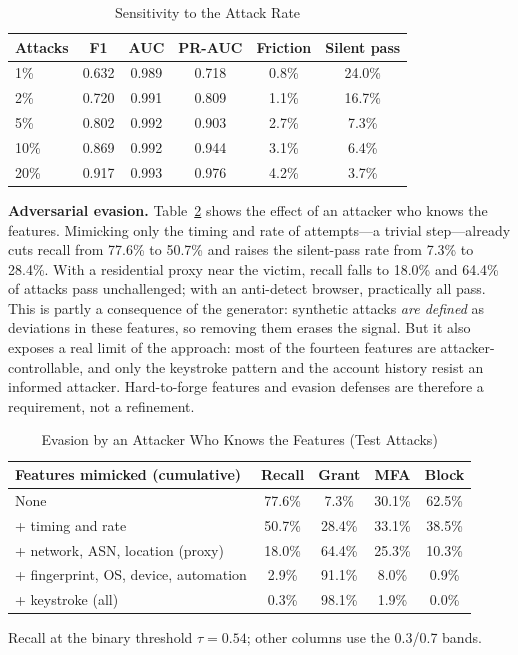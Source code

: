 \documentclass[conference]{IEEEtran}
\begin{document}
\begin{table}[t]
\caption{Sensitivity to the Attack Rate}
\label{tab:prop}
\centering
\footnotesize
\setlength{\tabcolsep}{4pt}
\renewcommand{\arraystretch}{1.15}
\begin{tabular}{@{}lccccc@{}}
\toprule
\textbf{Attacks} & \textbf{F1} & \textbf{AUC} & \textbf{PR-AUC} & \textbf{Friction} & \textbf{Silent pass} \\
\midrule
1\%  & 0.632 & 0.989 & 0.718 & 0.8\% & 24.0\% \\
2\%  & 0.720 & 0.991 & 0.809 & 1.1\% & 16.7\% \\
5\%  & 0.802 & 0.992 & 0.903 & 2.7\% & 7.3\% \\
10\% & 0.869 & 0.992 & 0.944 & 3.1\% & 6.4\% \\
20\% & 0.917 & 0.993 & 0.976 & 4.2\% & 3.7\% \\
\bottomrule
\end{tabular}
\end{table}

\textbf{Adversarial evasion.} Table~\ref{tab:evasion} shows the effect of
an attacker who knows the features. Mimicking only the timing and rate of
attempts---a trivial step---already cuts recall from 77.6\% to 50.7\% and
raises the silent-pass rate from 7.3\% to 28.4\%. With a residential proxy
near the victim, recall falls to 18.0\% and 64.4\% of attacks pass
unchallenged; with an anti-detect browser, practically all pass. This is
partly a consequence of the generator: synthetic attacks \emph{are
defined} as deviations in these features, so removing them erases the
signal. But it also exposes a real limit of the approach: most of the
fourteen features are attacker-controllable, and only the keystroke
pattern and the account history resist an informed attacker.
Hard-to-forge features and evasion defenses are therefore a requirement,
not a refinement.

\begin{table}[t]
\caption{Evasion by an Attacker Who Knows the Features (Test Attacks)}
\label{tab:evasion}
\centering
\footnotesize
\setlength{\tabcolsep}{3pt}
\renewcommand{\arraystretch}{1.15}
\begin{tabular}{@{}p{3.3cm}cccc@{}}
\toprule
\textbf{Features mimicked (cumulative)} & \textbf{Recall} & \textbf{Grant} & \textbf{MFA} & \textbf{Block} \\
\midrule
None & 77.6\% & 7.3\% & 30.1\% & 62.5\% \\
+ timing and rate & 50.7\% & 28.4\% & 33.1\% & 38.5\% \\
+ network, ASN, location (proxy) & 18.0\% & 64.4\% & 25.3\% & 10.3\% \\
+ fingerprint, OS, device, automation & 2.9\% & 91.1\% & 8.0\% & 0.9\% \\
+ keystroke (all) & 0.3\% & 98.1\% & 1.9\% & 0.0\% \\
\bottomrule
\end{tabular}

\vspace{2pt}
{\footnotesize Recall at the binary threshold $\tau=0.54$; other columns use the 0.3/0.7 bands.}
\end{table}
\end{document}
